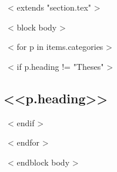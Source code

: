 ~< extends "section.tex" >~

~< block body >~
\vspace{-8mm}
\hfill
\vspace{2mm}

\renewcommand*{\bibfont}{\small}

~< for p in items.categories >~

~< if p.heading != "Theses" >~

\subsection{<<p.heading>>}
\begin{refsection}
\nocite{*}
\newrefcontext[labelprefix=<<p.prefix>>]
\printbibliography[heading=none]
\end{refsection}

~< endif >~

~< endfor >~



~< endblock body >~